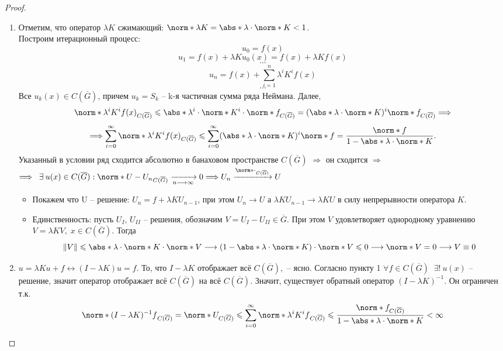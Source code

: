 \begin{proof}
  \begin{enumerate} 
  	\item Отметим, что оператор $\lambda K$ сжимающий: $\norm*{\lambda K} = \abs*{\lambda}\cdot\norm*{K} < 1$. \\Построим итерационный процесс:
    $$u_{0} = f(x)$$
    $$u_{1} = f(x) + \lambda K u_{0}(x) = f(x) + \lambda K f(x)$$
    $$\cdots$$
    $$u_{n} = f(x) + \sum_{i=1}^{n}\lambda^{i}K^{i}f(x)$$
    $$\cdots$$
    Все $u_{k}(x) \in C(\overline{G})$, причем $u_{k} = S_{k}$ -- k-я частичная сумма ряда Неймана.
    Далее, $$\norm*{\lambda^{i}K^{i}f(x)}_{C(\overline{G})} \leq \abs*{\lambda^{i}}\cdot\norm*{K}^{i}\cdot\norm*{f}_{C(\overline{G})}=(\abs*{\lambda}\cdot\norm*{K})^{i}\norm*{f}_{C(\overline{G})}\Longrightarrow$$ 
    $$\Longrightarrow \sum_{i=0}^{\infty}\norm*{\lambda^{i}K^{i}f(x)}_{C(\overline{G})} \leq \sum_{i=0}^{\infty}(\abs*{\lambda}\cdot\norm*{K})^{i}\norm*{f} = \frac{\norm*{f}}{1 - \abs*{\lambda}\cdot\norm*{K}}.$$
    Указанный в условии ряд сходится абсолютно в банаховом пространстве $C(\overline{G})$ $\Longrightarrow$ он сходится $\Longrightarrow$ \\ $\Longrightarrow \Exists u(x) \in C(\overline{G}): \norm*{U - U_{n}}_{C(\overline{G})} \xrightarrow[n \longrightarrow \infty]{} 0 \Longrightarrow U_{n} \xrightarrow{\norm*{\cdot}_{C(\overline{G})}} U$
    \begin{itemize}
	  \item Покажем что U -- решение: $U_{n} = f + \lambda K U_{n-1}$, при этом $U_{n} \longrightarrow U$ а $\lambda K U_{n-1} \longrightarrow \lambda K U$ в силу непрерывности оператора $K$.
      \item Единственность: пусть $U_{I}$, $U_{II}$ -- решения, обозначим $V = U_{I} - U_{II} \in \overline{G}$. При этом $V$ удовлетворяет однородному уравнению $V = \lambda K V, \; x \in C(\overline{G})$. Тогда $$\|V\| \leq \abs*{\lambda}\cdot\norm*{K}\cdot\norm*{V} \longrightarrow (1 - \abs*{\lambda}\cdot\norm*{K})\cdot\norm*{V} \leq 0 \longrightarrow \norm*{V} = 0 \longrightarrow V \equiv 0$$
	\end{itemize}
    \item $u = \lambda Ku + f \longleftrightarrow (I - \lambda  K)u = f$. То, что $I - \lambda K$ отображает всё $C(\overline{G}),$ -- ясно. Согласно пункту 1 $\forall f \in C(\overline{G}) \;\;\exists!\ u(x)$ -- решение, значит оператор отображает всё $C(\overline{G})$ на всё $C(\overline{G})$. Значит, существует обратный оператор $(I - \lambda K)^{-1}$. Он ограничен т.к. $$\norm*{(I - \lambda K)^{-1}f}_{C(\overline{G})} = \norm*{U}_{C(\overline{G})} \leq \sum_{i = 0}^{\infty}\norm*{\lambda^{i}K^{i}f}_{C(\overline{G})} \leq \frac{\norm*{f}_{C(\overline{G})}}{1 - \abs*{\lambda}\cdot\norm*{K}} < \infty$$
  \end{enumerate}
\end{proof}
